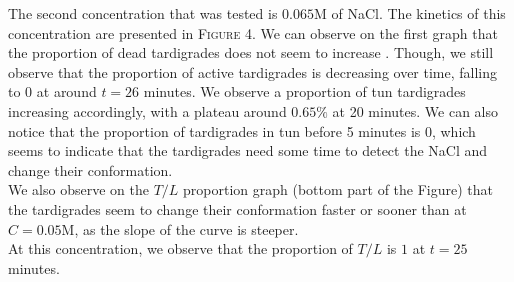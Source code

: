 \documentclass[12pt,a4paper, twocolumn]{article}
\begin{document}
The second concentration that was tested is $0.065$M of NaCl. The kinetics of this concentration are presented in \textsc{Figure} 4. We can observe on the first graph that the proportion of dead tardigrades does not seem to increase . Though, we still observe that the proportion of active tardigrades is decreasing over time, falling to $0$ at around $t=26$ minutes. We observe a proportion of tun tardigrades increasing accordingly, with a plateau around $0.65\%$ at 20 minutes. We can also notice that the proportion of tardigrades in tun before 5 minutes is 0, which seems to indicate that the tardigrades need some time to detect the NaCl and change their conformation.\\
We also observe on the $T/L$ proportion graph (bottom part of the Figure) that the tardigrades seem to change their conformation faster or sooner than at $C=0.05$M, as the slope of the curve is steeper.\\
At this concentration, we observe that the proportion of $T/L$ is $1$ at $t=25$ minutes.
\end{document}
